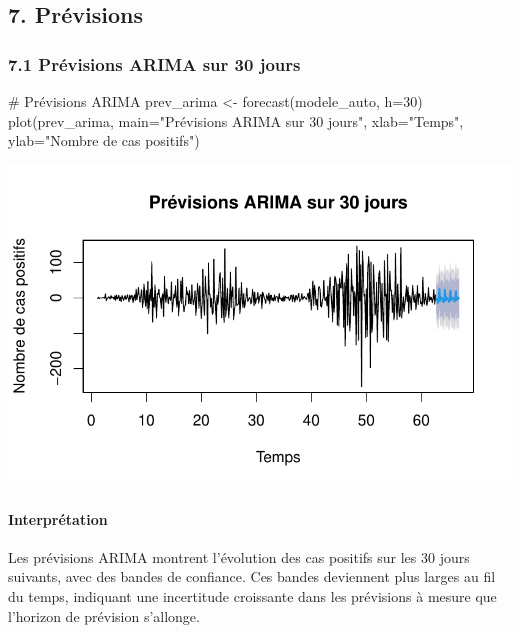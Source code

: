 \documentclass[
  letterpaper,
  DIV=11,
  numbers=noendperiod]{scrartcl}
\let\oldparagraph\paragraph
\renewcommand{\paragraph}[1]{\oldparagraph{#1}\mbox{}}
\newenvironment{Shaded}{\begin{snugshade}}{\end{snugshade}}
\newcommand{\AttributeTok}[1]{\textcolor[rgb]{0.40,0.45,0.13}{#1}}
\newcommand{\CommentTok}[1]{\textcolor[rgb]{0.37,0.37,0.37}{#1}}
\newcommand{\DecValTok}[1]{\textcolor[rgb]{0.68,0.00,0.00}{#1}}
\newcommand{\FunctionTok}[1]{\textcolor[rgb]{0.28,0.35,0.67}{#1}}
\newcommand{\NormalTok}[1]{\textcolor[rgb]{0.00,0.23,0.31}{#1}}
\newcommand{\OtherTok}[1]{\textcolor[rgb]{0.00,0.23,0.31}{#1}}
\newcommand{\StringTok}[1]{\textcolor[rgb]{0.13,0.47,0.30}{#1}}
\begin{document}
\subsection{7. Prévisions}\label{pruxe9visions}

\subsubsection{7.1 Prévisions ARIMA sur 30
jours}\label{pruxe9visions-arima-sur-30-jours}

\begin{Shaded}
\begin{Highlighting}[]
\CommentTok{\# Prévisions ARIMA}
\NormalTok{prev\_arima }\OtherTok{\textless{}{-}} \FunctionTok{forecast}\NormalTok{(modele\_auto, }\AttributeTok{h=}\DecValTok{30}\NormalTok{)}
\FunctionTok{plot}\NormalTok{(prev\_arima, }\AttributeTok{main=}\StringTok{"Prévisions ARIMA sur 30 jours"}\NormalTok{,}
     \AttributeTok{xlab=}\StringTok{"Temps"}\NormalTok{, }\AttributeTok{ylab=}\StringTok{"Nombre de cas positifs"}\NormalTok{)}
\end{Highlighting}
\end{Shaded}

\includegraphics{TS_files/figure-pdf/unnamed-chunk-7-1.pdf}

\paragraph{Interprétation}\label{interpruxe9tation-5}

Les prévisions ARIMA montrent l'évolution des cas positifs sur les 30
jours suivants, avec des bandes de confiance. Ces bandes deviennent plus
larges au fil du temps, indiquant une incertitude croissante dans les
prévisions à mesure que l'horizon de prévision s'allonge.
\end{document}

